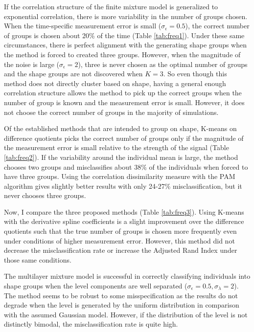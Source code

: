 If the correlation structure of the finite mixture model is generalized to exponential correlation, there is more variability in the number of groups chosen. When the time-specific measurement error is small ($\sigma_{\epsilon}=0.5$), the correct number of groups is chosen about 20\% of the time (Table \ref{tab:freq1}). Under these same circumstances, there is perfect alignment with the generating shape groups when the method is forced to created three groups. However, when the magnitude of the noise is large ($\sigma_{\epsilon}=2$), three is never chosen as the optimal number of groups and the shape groups are not discovered when $K=3$. So even though this method does not directly cluster based on shape, having a general enough correlation structure allows the method to pick up the correct groups when the number of group is known and the measurement error is small. However, it does not choose the correct number of groups in the majority of simulations. 

Of the established methods that are intended to group on shape, K-means on difference quotients picks the correct number of groups only if the magnitude of the measurement error is small relative to the strength of the signal (Table \ref{tab:freq2}). If the variability around the individual mean is large, the method chooses two groups and misclassifies about 38\% of the individuals when forced to have three groups. Using the correlation dissimilarity measure with the PAM algorithm gives slightly better results with only 24-27\% misclassification, but it never chooses three groups.

Now, I compare the three proposed methods (Table \ref{tab:freq3}). Using K-means with the derivative spline coefficients is a slight improvement over the difference quotients such that the true number of groups is chosen more frequently even under conditions of higher measurement error. However, this method did not decrease the misclassification rate or increase the Adjusted Rand Index under those same conditions. 

The multilayer mixture model is successful in correctly classifying individuals into shape groups when the level components are well separated ($\sigma_{\epsilon}=0.5, \sigma_{\lambda}=2$). The method seems to be robust to some misspecification as the results do not degrade when the level is generated by the uniform distribution in comparison with the assumed Gaussian model. However, if the distribution of the level is not distinctly bimodal, the misclassification rate is quite high.

